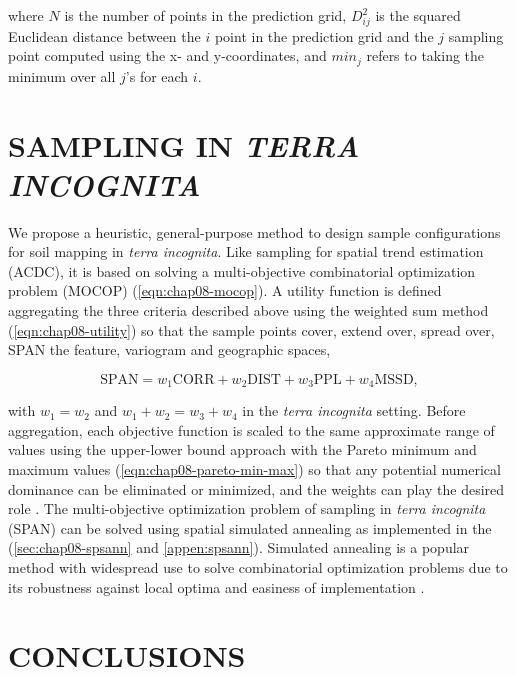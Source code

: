 \noindent where $N$ is the number of points in the prediction grid, $D_{ij}^2$ is the squared Euclidean 
distance between the $i$ point in the prediction grid and the $j$ sampling point computed using the x- and 
y-coordinates, and $min_j$ refers to taking the minimum over all $j$’s for each $i$.

\section{SAMPLING IN \emph{TERRA INCOGNITA}}

We propose a heuristic, general-purpose method to design sample configurations for soil mapping in \emph{terra 
incognita}. Like sampling for spatial trend estimation (ACDC), it is based on solving a multi-objective 
combinatorial optimization problem (MOCOP) (\autoref{eqn:chap08-mocop}). A utility function is defined 
aggregating the three criteria described above using the weighted sum method (\autoref{eqn:chap08-utility})
so that the sample points cover, extend over, spread over, SPAN the feature, variogram and geographic spaces,

\begin{equation}\label{eqn:chap08-span}
\text{SPAN} = w_1 \text{CORR} + w_2 \text{DIST} + w_3 \text{PPL} + w_4 \text{MSSD}, 
\end{equation}

\noindent with $w_1 = w_2$ and $w_1 + w_2 = w_3 + w_4$ in the \emph{terra incognita} setting. Before 
aggregation, each objective function is scaled to the same approximate range of values using the upper-lower 
bound approach with the Pareto minimum and maximum values (\autoref{eqn:chap08-pareto-min-max}) so that any 
potential numerical dominance can be eliminated or minimized, and the weights can play the desired role 
\cite{MarlerEtAl2005, MarlerEtAl2009}. The multi-objective optimization problem of sampling in 
\emph{terra incognita} (SPAN) can be solved using spatial simulated annealing as implemented in the 
 (\autoref{sec:chap08-spsann} and \autoref{appen:spsann}). Simulated annealing is a popular 
method with widespread use to solve combinatorial optimization problems due to its robustness against local 
optima and easiness of implementation \cite{MetropolisEtAl1953, KirkpatrickEtAl1983, Cerny1985, AartsEtAl1989, 
Groenigen1999a}.

\section{CONCLUSIONS}

